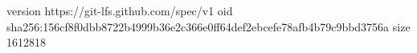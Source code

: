 version https://git-lfs.github.com/spec/v1
oid sha256:156cf8f0dbb8722b4999b36e2c366e0ff64def2ebcefe78afb4b79c9bbd3756a
size 1612818
